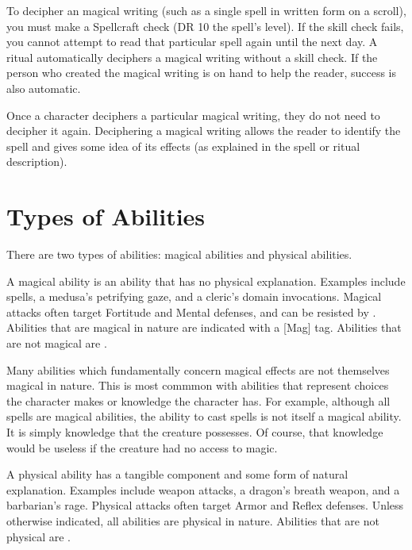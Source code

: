         To decipher an magical writing (such as a single spell in written form on a scroll), you must make a Spellcraft check (DR 10 \add the spell's level). If the skill check fails, you cannot attempt to read that particular spell again until the next day.
        A  ritual automatically deciphers a magical writing without a skill check.
        If the person who created the magical writing is on hand to help the reader, success is also automatic.

        Once a character deciphers a particular magical writing, they do not need to decipher it again.
        Deciphering a magical writing allows the reader to identify the spell and gives some idea of its effects (as explained in the spell or ritual description).

\section{Types of Abilities}

    There are two types of abilities: magical abilities and physical abilities.

    \label{Magical Abilities} A magical ability is an ability that has no physical explanation.
    Examples include spells, a medusa's petrifying gaze, and a cleric's domain invocations.
    Magical attacks often target Fortitude and Mental defenses, and can be resisted by .
    Abilities that are magical in nature are indicated with a [Mag] tag.
    Abilities that are not magical are .

    Many abilities which fundamentally concern magical effects are not themselves magical in nature.
    This is most commmon with abilities that represent choices the character makes or knowledge the character has.
    For example, although all spells are magical abilities, the ability to cast spells is not itself a magical ability.
    It is simply knowledge that the creature possesses.
    Of course, that knowledge would be useless if the creature had no access to magic.

    \label{Physical Abilities} A physical ability has a tangible component and some form of natural explanation.
    Examples include weapon attacks, a dragon's breath weapon, and a barbarian's rage.
    Physical attacks often target Armor and Reflex defenses.
    Unless otherwise indicated, all abilities are physical in nature.
    Abilities that are not physical are .
